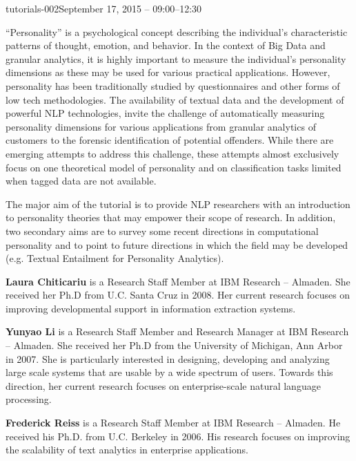 \begin{tutorial}{tutorials-002}{September 17, 2015 -- 09:00--12:30}
{\TutLocB}

``Personality'' is a psychological concept describing the individual's
characteristic patterns of thought, emotion, and behavior. In the
context of Big Data and granular analytics, it is highly important
to measure the individual's personality dimensions as these may be
used for various practical applications. However, personality has
been traditionally studied by questionnaires and other forms of low
tech methodologies. The availability of textual data and the development
of powerful NLP technologies, invite the challenge of automatically
measuring personality dimensions for various applications from granular
analytics of customers to the forensic identification of potential
offenders. While there are emerging attempts to address this challenge,
these attempts almost exclusively focus on one theoretical model of
personality and on classification tasks limited when tagged data are
not available.

The major aim of the tutorial is to provide NLP researchers with an
introduction to personality theories that may empower their scope
of research. In addition, two secondary aims are to survey some recent
directions in computational personality and to point to future directions
in which the field may be developed (e.g. Textual Entailment for Personality
Analytics).

\end{tutorial} 

\clearpage{}

\begin{bio}

\textbf{Laura Chiticariu} is a Research Staff Member at IBM Research
– Almaden. She received her Ph.D from U.C. Santa Cruz in 2008. Her
current research focuses on improving developmental support in information
extraction systems.

\textbf{Yunyao Li} is a Research Staff Member and Research Manager
at IBM Research – Almaden. She received her Ph.D from the University
of Michigan, Ann Arbor in 2007. She is particularly interested in
designing, developing and analyzing large scale systems that are usable
by a wide spectrum of users. Towards this direction, her current research
focuses on enterprise-scale natural language processing.

\textbf{Frederick Reiss }is a Research Staff Member at IBM Research
– Almaden. He received his Ph.D. from U.C. Berkeley in 2006. His research
focuses on improving the scalability of text analytics in enterprise
applications.

   

\end{bio}


